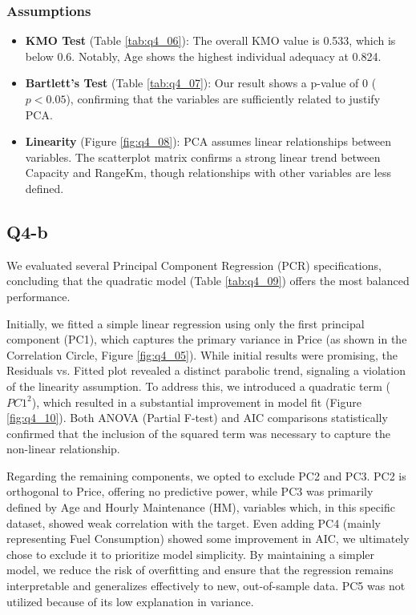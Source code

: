 \subsubsection*{Assumptions}

\begin{itemize}
    \item \textbf{KMO Test} (Table \ref{tab:q4_06}): The overall KMO value is 0.533, which is below 0.6. Notably, Age shows the highest individual adequacy at 0.824.
    \item \textbf{Bartlett's Test} (Table \ref{tab:q4_07}): Our result shows a p-value of 0 ($p < 0.05$), confirming that the variables are sufficiently related to justify PCA.
    \item \textbf{Linearity} (Figure \ref{fig:q4_08}): PCA assumes linear relationships between variables. The scatterplot matrix confirms a strong linear trend between Capacity and RangeKm, though relationships with other variables are less defined.
\end{itemize}

\subsection{Q4-b}

We evaluated several Principal Component Regression (PCR) specifications, concluding that the quadratic model (Table \ref{tab:q4_09}) offers the most balanced performance.

Initially, we fitted a simple linear regression using only the first principal component (PC1), which captures the primary variance in Price (as shown in the Correlation Circle, Figure \ref{fig:q4_05}). While initial results were promising, the Residuals vs. Fitted plot revealed a distinct parabolic trend, signaling a violation of the linearity assumption. To address this, we introduced a quadratic term ($PC1^2$), which resulted in a substantial improvement in model fit (Figure \ref{fig:q4_10}). Both ANOVA (Partial F-test) and AIC comparisons statistically confirmed that the inclusion of the squared term was necessary to capture the non-linear relationship.

Regarding the remaining components, we opted to exclude PC2 and PC3. PC2 is orthogonal to Price, offering no predictive power, while PC3 was primarily defined by Age and Hourly Maintenance (HM), variables which, in this specific dataset, showed weak correlation with the target. Even adding PC4 (mainly representing Fuel Consumption) showed some improvement in AIC, we ultimately chose to exclude it to prioritize model simplicity. By maintaining a simpler model, we reduce the risk of overfitting and ensure that the regression remains interpretable and generalizes effectively to new, out-of-sample data. PC5 was not utilized because of its low explanation in variance.

